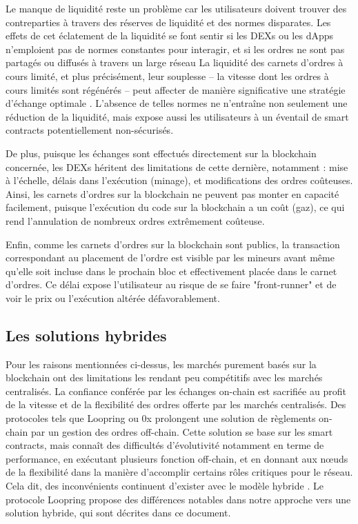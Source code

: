 \documentclass[UTF8,nofonts]{article}
\begin{document}
\begin{multicols}{2}
Le manque de liquidité reste un problème car les utilisateurs doivent trouver des contreparties à travers des réserves de liquidité et des normes disparates. Les effets de cet éclatement de la liquidité se font sentir si les DEXs ou les dApps n'emploient pas de normes constantes pour interagir, et si les ordres ne sont pas partagés ou diffusés à travers un large réseau La liquidité des carnets d'ordres à cours limité, et plus précisément, leur souplesse -- la vitesse dont les ordres à cours limités sont régénérés -- peut affecter de manière significative une stratégie d'échange optimale \cite{limitorderliquidity}. L'absence de telles normes ne n'entraîne non seulement une réduction de la liquidité, mais expose aussi les utilisateurs à un éventail de smart contracts potentiellement non-sécurisés.

De plus, puisque les échanges sont effectués directement sur la blockchain concernée, les DEXs héritent des limitations de cette dernière, notamment : mise à l'échelle, délais dans l'exécution (minage), et modifications des ordres coûteuses. Ainsi, les carnets d'ordres sur la blockchain ne peuvent pas monter en capacité facilement, puisque l'exécution du code sur la blockchain a un coût (gaz), ce qui rend l'annulation de nombreux ordres extrêmement coûteuse. 

Enfin, comme les carnets d'ordres sur la blockchain sont publics, la transaction correspondant au placement de l'ordre est visible par les mineurs avant même qu'elle soit incluse dans le prochain bloc et effectivement placée dans le carnet d'ordres. Ce délai expose l'utilisateur au risque de se faire "front-runner" et de voir le prix ou l'exécution altérée défavorablement.

\subsection{Les solutions hybrides}
Pour les raisons mentionnées ci-dessus, les marchés purement basés sur la blockchain ont des limitations les rendant peu compétitifs avec les marchés centralisés. La confiance conférée par les échanges on-chain est sacrifiée au profit de la vitesse et de la flexibilité des ordres offerte par les marchés centralisés. Des protocoles tels que Loopring ou 0x \cite{warren20170x} prolongent une solution de règlements on-chain par un gestion des ordres off-chain. Cette solution se base sur les smart contracts, mais connaît des difficultés d'évolutivité notamment en terme de performance, en exécutant plusieurs fonction off-chain, et en donnant aux nœuds de la flexibilité dans la manière d'accomplir certains rôles critiques pour le réseau. Cela dit, des inconvénients continuent d'exister avec le modèle hybride \cite{costofdecent}. Le protocole Loopring propose des différences notables dans notre approche vers une solution hybride, qui sont décrites dans ce document.



\end{multicols}
\end{document}

